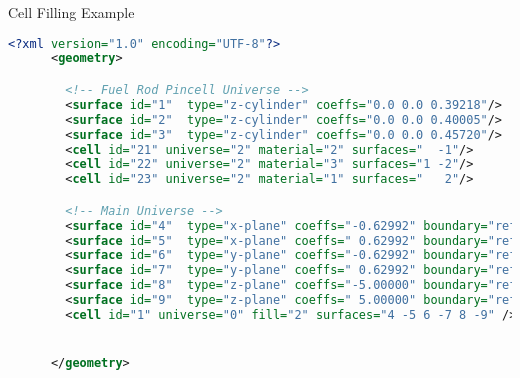 \begin{frame}[fragile]{Cell Filling Example}


  \begin{scriptsize}
    \begin{lstlisting}[language=XML,gobble=4]
      <?xml version="1.0" encoding="UTF-8"?>
      <geometry>

        <!-- Fuel Rod Pincell Universe -->
        <surface id="1"  type="z-cylinder" coeffs="0.0 0.0 0.39218"/>     <!-- fuel OR   -->
        <surface id="2"  type="z-cylinder" coeffs="0.0 0.0 0.40005"/>     <!-- gap OR    -->
        <surface id="3"  type="z-cylinder" coeffs="0.0 0.0 0.45720"/>     <!-- clad OR   -->
        <cell id="21" universe="2" material="2" surfaces="  -1"/>         <!-- fuel  -->
        <cell id="22" universe="2" material="3" surfaces="1 -2"/>         <!-- clad  -->
        <cell id="23" universe="2" material="1" surfaces="   2"/>         <!-- water -->

        <!-- Main Universe -->
        <surface id="4"  type="x-plane" coeffs="-0.62992" boundary="reflective"/>
        <surface id="5"  type="x-plane" coeffs=" 0.62992" boundary="reflective"/>
        <surface id="6"  type="y-plane" coeffs="-0.62992" boundary="reflective"/>
        <surface id="7"  type="y-plane" coeffs=" 0.62992" boundary="reflective"/>
        <surface id="8"  type="z-plane" coeffs="-5.00000" boundary="reflective"/>
        <surface id="9"  type="z-plane" coeffs=" 5.00000" boundary="reflective"/>
        <cell id="1" universe="0" fill="2" surfaces="4 -5 6 -7 8 -9" />


      </geometry>
    \end{lstlisting}
  \end{scriptsize}

  \centering

\end{frame}


